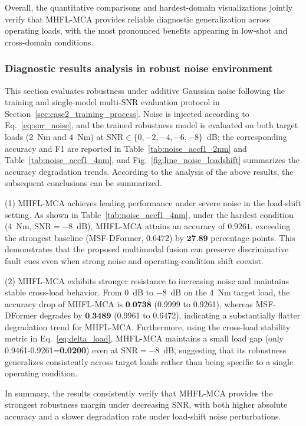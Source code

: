 \documentclass[a4paper]{cas-sc}
\begin{document}
Overall, the quantitative comparisons and hardest-domain visualizations jointly verify that MHFL-MCA provides reliable diagnostic generalization across operating loads, with the most pronounced benefits appearing in low-shot and cross-domain conditions.

\subsubsection{Diagnostic results analysis in robust noise environment}
This section evaluates robustness under additive Gaussian noise following the training and single-model multi-SNR evaluation protocol in Section~\ref{sec:case2_training_process}. Noise is injected according to Eq.~\eqref{eq:snr_noise}, and the trained robustness model is evaluated on both target loads (2~Nm and 4~Nm) at $\mathrm{SNR}\in\{0,-2,-4,-6,-8\}$~dB; the corresponding accuracy and F1 are reported in Table~\ref{tab:noise_accf1_2nm} and Table~\ref{tab:noise_accf1_4nm}, and Fig.~\ref{fig:line_noise_loadshift} summarizes the accuracy degradation trends. According to the analysis of the above results, the subsequent conclusions can be summarized.


(1) MHFL-MCA achieves leading performance under severe noise in the load-shift setting. As shown in Table~\ref{tab:noise_accf1_4nm}, under the hardest condition (4~Nm, $\mathrm{SNR}=-8$~dB), MHFL-MCA attains an accuracy of $0.9261$, exceeding the strongest baseline (MSF-DFormer, $0.6472$) by $\textbf{27.89}$ percentage points. This demonstrates that the proposed multimodal fusion can preserve discriminative fault cues even when strong noise and operating-condition shift coexist.

(2) MHFL-MCA exhibits stronger resistance to increasing noise and maintains stable cross-load behavior. From $0$~dB to $-8$~dB on the 4~Nm target load, the accuracy drop of MHFL-MCA is $\textbf{0.0738}$ (0.9999 to 0.9261), whereas MSF-DFormer degrades by $\textbf{0.3489}$ (0.9961 to 0.6472), indicating a substantially flatter degradation trend for MHFL-MCA.
Furthermore, using the cross-load stability metric in Eq.~\eqref{eq:delta_load}, MHFL-MCA maintains a small load gap (only 0.9461-0.9261=\textbf{0.0200}) even at $\mathrm{SNR}=-8$~dB, suggesting that its robustness generalizes consistently across target loads rather than being specific to a single operating condition.

In summary, the results consistently verify that MHFL-MCA provides the strongest robustness margin under decreasing SNR, with both higher absolute accuracy and a slower degradation rate under load-shift noise perturbations.
\end{document}
